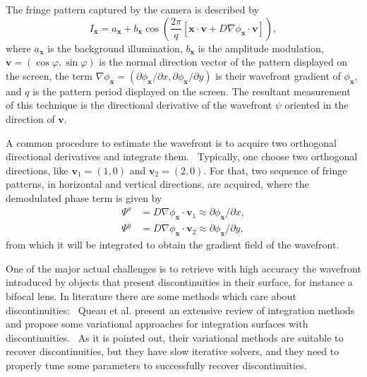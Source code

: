 \documentclass[12pt,letterpaper]{article}
\begin{document}
The fringe pattern captured by the camera is described by
\begin{equation}\label{eq:franjas}
I_{\mathbf{x}} = a_{\mathbf{x}} + b_{\mathbf{x}}\cos\left( \frac{2\pi}{q}\left[\mathbf{x}\cdot\mathbf{v} + D\nabla\phi_{\mathbf{x}}\cdot\mathbf{v}\right] \right),  
\end{equation}
where $a_{\mathbf{x}}$ is the background illumination, $b_{\mathbf{x}}$ is the amplitude modulation, $\mathbf{v} = (\cos\varphi,\sin\varphi)$ is the normal direction vector of the pattern displayed on the screen, the term $\nabla\phi_{\mathbf{x}} = (\partial\phi_{\mathbf{x}}/\partial x,\partial\phi_{\mathbf{x}}/\partial y) $ is their wavefront gradient of $\phi_{\mathbf{x}}$, and $q$ is the pattern period displayed on the screen. The resultant measurement of this technique is the directional derivative of the wavefront $\psi$ oriented in the direction of $\mathbf{v}$. 

A common procedure to estimate the wavefront is to acquire two orthogonal directional derivatives and integrate them.~\cite{Fried1977,Hudgin1977a,Frankot1988,Roddier1991,Zou2000} Typically, one choose two orthogonal directions, like $\mathbf{v}_{1} = (1,0)$ and $\mathbf{v}_{2} = (2,0).$ For that, two sequence of fringe patterns, in horizontal and vertical directions, are acquired, where the demodulated phase term is given by 
\begin{align*}
\Psi^{x} &= D\nabla\phi_{\mathbf{x}}\cdot\mathbf{v}_1 \approx \partial\phi_{\mathbf{x}}/\partial x,\\
\Psi^{y} &= D\nabla\phi_{\mathbf{x}}\cdot\mathbf{v}_2 \approx \partial\phi_{\mathbf{x}}/\partial y, 
\end{align*}
from which it will be integrated to obtain the gradient field of the wavefront.~\cite{Fried1977,Hudgin1977a,Frankot1988,Roddier1991}

One of the major actual challenges is to retrieve with high accuracy the wavefront introduced by objects that present discontinuities in their surface, for instance a bifocal lens. In literature there are some methods which care about discontinuities:~\cite{Karacali2003,Reddy2009,DiMartino2018,Queau2018a,Queau2018} Queau et al. present an extensive review of integration methods~\cite{Queau2018a} and propose some variational approaches for integration surfaces with discontinuities.~\cite{Queau2018} As it is pointed out, their variational methods are suitable to recover discontinuities, but they have slow iterative solvers, and they need to properly tune some parameters to successfully recover discontinuities.
\end{document}
